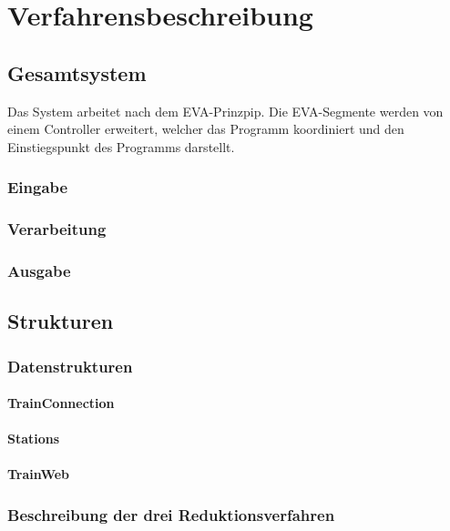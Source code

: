 \chapter{Verfahrensbeschreibung}\label{ch:verfahrensbeschreibung}


\section{Gesamtsystem}\label{sec:gesamtsystem}
Das System arbeitet nach dem EVA-Prinzpip. Die EVA-Segmente werden von einem Controller erweitert, welcher das Programm koordiniert und den Einstiegspunkt des Programms darstellt.

\subsection{Eingabe}\label{subsec:eingabe}
\subsection{Verarbeitung}\label{subsec:verarbeitung}
\subsection{Ausgabe}\label{subsec:ausgabe}

\section{Strukturen}\label{sec:strukturen}
\subsection{Datenstrukturen}\label{subsec:datenstrukt}
\subsubsection{TrainConnection}\label{subsubsec:trainconnection}
\subsubsection{Stations}\label{subsubsec:stations}
\subsubsection{TrainWeb}\label{subsubsec:trainweb}

\subsection{Beschreibung der drei Reduktionsverfahren}
